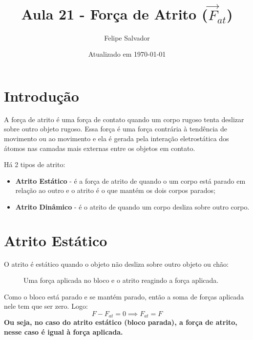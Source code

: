 \documentclass[12pt]{extarticle}
\title{Aula 21 - Força de Atrito ($\vec{F}_{at}$)}
\author{Felipe Salvador}
\date{Atualizado em \today}
\newcommand{\<}{\langle}
\renewcommand{\>}{\rangle}
\theoremstyle{definition}
\begin{document}
\maketitle

\section{Introdução}
A força de atrito é uma força de contato quando um corpo rugoso tenta deslizar sobre outro objeto rugoso. Essa força é uma força contrária à tendência de movimento ou ao movimento e ela é gerada pela interação eletrostática dos átomos nas camadas mais externas entre os objetos em contato.

Há 2 tipos de atrito:
\begin{itemize}
    \item \textbf{Atrito Estático} - é a força de atrito de quando o um corpo está parado em relação ao outro e o atrito é o que mantém os dois corpos parados;
    \item \textbf{Atrito Dinâmico} - é o atrito de quando um corpo desliza sobre outro corpo.
\end{itemize}

\section{Atrito Estático}
O atrito é estático quando o objeto não desliza sobre outro objeto ou chão:
\begin{figure}[H]
    \centering
    \caption{Uma força aplicada no bloco e o atrito reagindo a força aplicada.}
    \label{fig:atrito_estat}
\end{figure}

Como o bloco está parado e se mantém parado, então a soma de forças aplicada nele tem que ser zero. Logo:
\begin{equation}
    F - F_{at} = 0 \implies \boxed{F_{at}=F}
\end{equation}
\textbf{Ou seja, no caso do atrito estático (bloco parada), a força de atrito, nesse caso é igual à força aplicada.}
\end{document}
